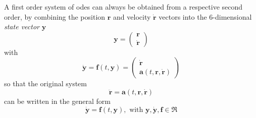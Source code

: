 A first order system of \glspl{ode} can always be obtained from a respective second 
order, by combining the position $\bm{r}$ and velocity $\bm{\dot{r}}$ vectors into 
the 6-dimensional \emph{state vector} $\bm{y}$
\begin{equation}
    \bm{y} = \begin{pmatrix}\bm{r}\\ \bm{\dot{r}} \end{pmatrix}
\end{equation}
with 
\begin{equation}
    \bm{\dot{y}} = \bm{f}(t,\bm{y}) = \begin{pmatrix}\bm{\dot{r}} \\ \bm{a}(t, \bm{r}, \bm{\dot{r}}) \end{pmatrix}
\end{equation}
so that the original system
\begin{equation}
    \bm{\ddot{r}} = \bm{a}(t, \bm{r}, \bm{\dot{r}})
\end{equation}
can be written in the general form
\begin{equation}\label{eq:genode0}
    \bm{\dot{y}} = \bm{f}(t,\bm{y}), \text{ with } \bm{y}, \bm{\dot{y}}, \bm{f} \in \Re
\end{equation}
